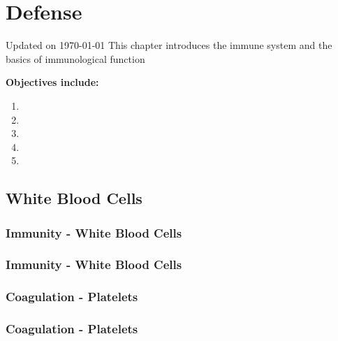 \chapter{Defense}\label{chp:defense}
Updated on \today
\minitoc
This chapter introduces the immune system and the basics of immunological function


\vspace{5mm}

\textbf{Objectives include:}
\begin{enumerate}
    \item
    \item
    \item
    \item
    \item
\end{enumerate}

\section{White Blood Cells}

\subsection{Immunity - White Blood Cells}


\subsection{Immunity - White Blood Cells}

\subsection{Coagulation - Platelets}

\subsection{Coagulation - Platelets}

\printbibliography[heading=subbibintoc]
